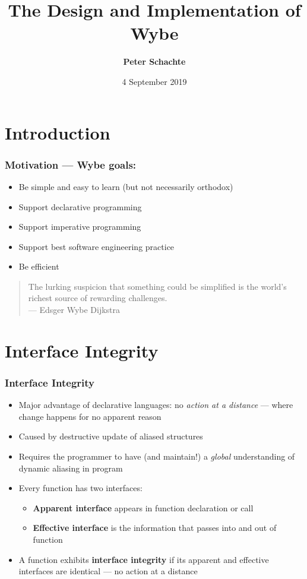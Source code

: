 \documentclass[12pt]{beamer}
\title[Introducing Wybe]{The Design and Implementation of Wybe}
\author[Peter Schachte]
{\textbf{Peter Schachte} }
\institute[Melbourne Uni]{The University of Melbourne \\ School of
  Computing and Information Systems}
\date{4 September 2019}
\begin{document}
\frame{\titlepage}

\section{Introduction}

\begin{frame}[fragile]
\frametitle{Motivation --- Wybe goals:}
\begin{itemize}
\item Be simple and easy to learn (but not necessarily orthodox)
\item Support declarative programming
\item Support imperative programming
\item Support best software engineering practice
\item Be efficient
\end{itemize}
\vspace{2ex}
\begin{quote}
  The lurking suspicion that something could be simplified is the
world's richest source of rewarding challenges. \\
\hspace*{1cm} --- Edsger Wybe Dijkstra
\end{quote}
\end{frame}

\section{Interface Integrity}

\begin{frame}[fragile]
\frametitle{Interface Integrity}
\begin{itemize}
\item Major advantage of declarative languages:  
  no \emph{action at a distance} --- where change happens for no apparent reason
\item Caused by destructive update of aliased structures
\item Requires the programmer to have (and maintain!) a \emph{global}
  understanding of dynamic aliasing in program
\item Every function has two interfaces:
  \begin{itemize}
  \item \textbf{Apparent interface} appears in function declaration
    or call
  \item \textbf{Effective interface} is the information that passes into and out of function
  \end{itemize}
\item A function exhibits \textbf{interface integrity} if its apparent and
effective interfaces are identical --- no action at a distance

\end{itemize}

\end{frame}
\end{document}
